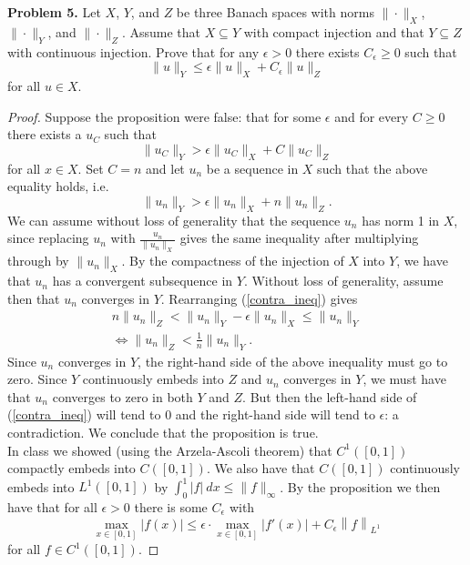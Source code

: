 \documentclass[11pt,letterpaper]{report}
\newcommand{\Lp}[2]{\left\|{#1}\right\|_{L^{#2}}}
\begin{document}
\noindent\textbf{Problem 5. }
Let $X$, $Y$, and $Z$ be three Banach spaces with norms $\|\cdot \|_X$, $\|\cdot \|_Y$, and $\|\cdot \|_Z$. Assume that $X\subseteq Y$ with compact injection and that $Y\subseteq Z$ with continuous injection. Prove that for any $\epsilon>0$ there exists $C_\epsilon\geq 0$ such that
\[
\|u\|_Y\leq \epsilon\|u\|_X+C_\epsilon\|u\|_Z
\]
for all $u\in X$.
\begin{proof}
	Suppose the proposition were false: that for some $\epsilon$ and for every $C\geq 0$ there exists a $u_C$ such that
	\[
	\|u_C\|_Y> \epsilon\|u_C\|_X+C\|u_C\|_Z
	\]
	for all $x\in X$. Set $C = n$ and let $u_n$ be a sequence in $X$ such that the above equality holds, i.e.
	\begin{equation}\label{contra_ineq}
	\|u_n\|_Y > \epsilon \|u_n\|_X + n\|u_n\|_Z.
	\end{equation}
	We can assume without loss of generality that the sequence $u_n$ has norm 1 in $X$, since replacing $u_n$ with $\frac{u_n}{\|u_n\|_X}$ gives the same inequality after multiplying through by $\|u_n\|_X$. By the compactness of the injection of $X$ into $Y$, we have that $u_n$ has a convergent subsequence in $Y$. Without loss of generality, assume then that $u_n$ converges in $Y$. Rearranging (\ref{contra_ineq}) gives
	\begin{gather*}
	n\|u_n\|_Z < \|u_n\|_Y - \epsilon \|u_n\|_X \leq \|u_n\|_Y
	\\ \iff
	\|u_n\|_Z <\frac{1}{n}\|u_n\|_Y.
	\end{gather*}
	\noindent Since $u_n$ converges in $Y$, the right-hand side of the above inequality must go to zero. Since $Y$ continuously embeds into $Z$ and $u_n$ converges in $Y$, we must have that $u_n$ converges to zero in both $Y$ and $Z$. But then the left-hand side of (\ref{contra_ineq}) will tend to 0 and the right-hand side will tend to $\epsilon$: a contradiction. We conclude that the proposition is true.\\

	\noindent In class we showed (using the Arzela-Ascoli theorem) that $C^1([0,1])$ compactly embeds into $C([0,1])$. We also have that $C([0,1])$ continuously embeds into $L^1([0,1])$ by $\int_0^1|f|\ dx \leq \|f\|_\infty$. By the proposition we then have that for all $\epsilon>0$ there is some $C_\epsilon$ with
	\[
	\max_{x\in [0,1]}|f(x)| \leq \epsilon\cdot \max_{x\in [0,1]}|f'(x)| + C_\epsilon\Lp{f}{1}
	\]
	for all $f\in C^1([0,1])$.
\end{proof}
\end{document}
